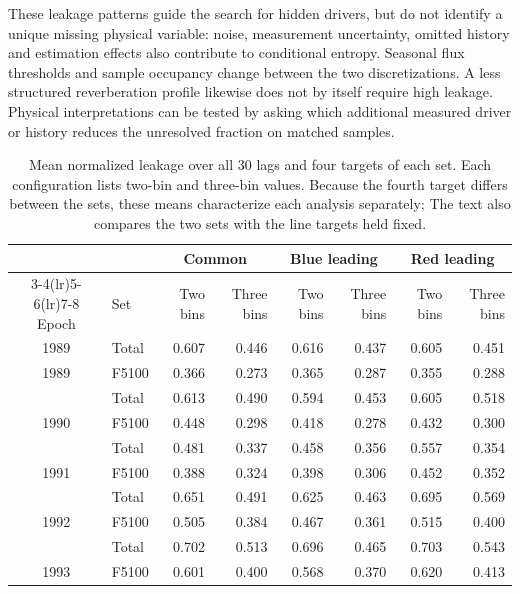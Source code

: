 \documentclass[fleqn,usenatbib]{mnras}
\newenvironment{SURDtable}{\begin{table}}{\end{table}}
\begin{document}
These leakage patterns guide the search for hidden drivers, but do not identify a unique missing physical variable: noise, measurement uncertainty, omitted history and estimation effects also contribute to conditional entropy. Seasonal flux thresholds and sample occupancy change between the two discretizations. A less structured reverberation profile likewise does not by itself require high leakage. Physical interpretations can be tested by asking which additional measured driver or history reduces the unresolved fraction on matched samples.

\begin{SURDtable}
\centering
\caption{Mean normalized leakage over all 30 lags and four targets of each set. Each configuration lists two-bin and three-bin values. Because the fourth target differs between the sets, these means characterize each analysis separately; The text also compares the two sets with the line targets held fixed.}
\label{tab:leakage_means}
\small
\begin{tabular}{clrrrrrr}
\toprule
& & \multicolumn{2}{c}{Common} & \multicolumn{2}{c}{Blue leading} & \multicolumn{2}{c}{Red leading} \\ \cmidrule(lr){3-4}\cmidrule(lr){5-6}\cmidrule(lr){7-8} Epoch & Set & Two bins & Three bins & Two bins & Three bins & Two bins & Three bins \\
\midrule
1989 & Total & 0.607 & 0.446 & 0.616 & 0.437 & 0.605 & 0.451 \\
1989 & F5100 & 0.366 & 0.273 & 0.365 & 0.287 & 0.355 & 0.288 \\
\addlinespace[2pt]
1990 & Total & 0.613 & 0.490 & 0.594 & 0.453 & 0.605 & 0.518 \\
1990 & F5100 & 0.448 & 0.298 & 0.418 & 0.278 & 0.432 & 0.300 \\
\addlinespace[2pt]
1991 & Total & 0.481 & 0.337 & 0.458 & 0.356 & 0.557 & 0.354 \\
1991 & F5100 & 0.388 & 0.324 & 0.398 & 0.306 & 0.452 & 0.352 \\
\addlinespace[2pt]
1992 & Total & 0.651 & 0.491 & 0.625 & 0.463 & 0.695 & 0.569 \\
1992 & F5100 & 0.505 & 0.384 & 0.467 & 0.361 & 0.515 & 0.400 \\
\addlinespace[2pt]
1993 & Total & 0.702 & 0.513 & 0.696 & 0.465 & 0.703 & 0.543 \\
1993 & F5100 & 0.601 & 0.400 & 0.568 & 0.370 & 0.620 & 0.413 \\
\bottomrule
\end{tabular}
\end{SURDtable}
\end{document}
